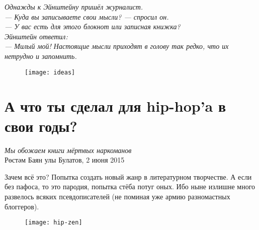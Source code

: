 \vfill

\newpage

\emph{Однажды к Эйнштейну пришёл журналист.\\
--- Куда вы записываете свои мысли? --- спросил он.\\
--- У вас есть для этого блокнот или записная книжка?\\
Эйнштейн ответил:\\
--- Милый мой! Настоящие мысли приходят в голову так редко, что их нетрудно и запомнить.}

\begin{figure}[ht!]
    \centering
    \texttt{[image: ideas]}
\end{figure}

\newpage

\section*{А что ты сделал для hip-hop'a в свои годы?}\label{section:one}
\begin{displayquote}
    \begin{flushright}
        \emph{Мы обожаем книги мёртвых наркоманов}\\
        Рөстәм Баян улы Булатов, 2 июня 2015
    \end{flushright}
\end{displayquote}
Зачем всё это? Попытка создать новый жанр в литературном творчестве.
А если без пафоса, то это пародия, попытка стёба потуг оных. Ибо ныне излишне много развелось всяких псевдописателей (не поминая уже армию разномастных блоггеров).

\begin{figure}[ht!]
    \centering
    \texttt{[image: hip-zen]}
\end{figure}
